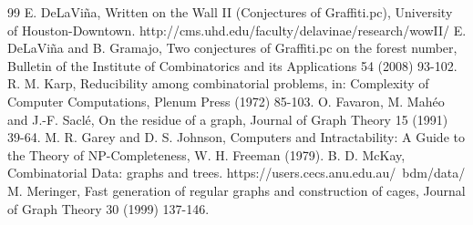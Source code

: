 \documentclass[paper=a4,fontsize=10.5pt,jafontsize=10.5pt]{jlreq}
\theoremstyle{plain}
\theoremstyle{definition}
\begin{document}
\begin{thebibliography}{99}
 E. DeLaViña, Written on the Wall II (Conjectures of Graffiti.pc), University of Houston-Downtown. http://cms.uhd.edu/faculty/delavinae/research/wowII/
 E. DeLaViña and B. Gramajo, Two conjectures of Graffiti.pc on the forest number, Bulletin of the Institute of Combinatorics and its Applications 54 (2008) 93-102.
 R. M. Karp, Reducibility among combinatorial problems, in: Complexity of Computer Computations, Plenum Press (1972) 85-103.
 O. Favaron, M. Mahéo and J.-F. Saclé, On the residue of a graph, Journal of Graph Theory 15 (1991) 39-64.
 M. R. Garey and D. S. Johnson, Computers and Intractability: A Guide to the Theory of NP-Completeness, W. H. Freeman (1979).
 B. D. McKay, Combinatorial Data: graphs and trees. https://users.cecs.anu.edu.au/~bdm/data/
 M. Meringer, Fast generation of regular graphs and construction of cages, Journal of Graph Theory 30 (1999) 137-146.
\end{thebibliography}
\end{document}
